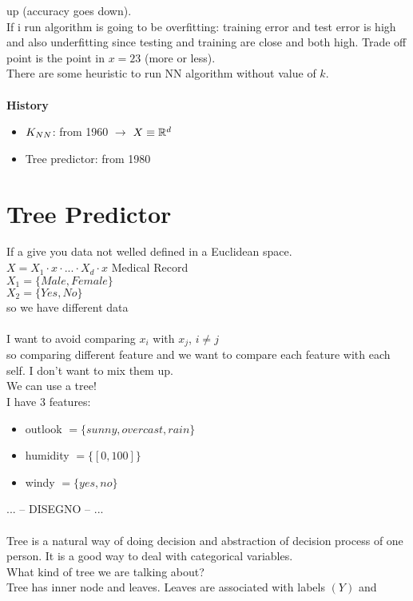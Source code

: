 \documentclass[../main.tex]{subfiles}
\begin{document}
up (accuracy goes down).\\
If i run algorithm is going to be overfitting: training error and test error is high and also underfitting since testing and training are close and both high.
Trade off point is the point in $x = 23$ (more or less).\\
There are some heuristic to run NN algorithm without value of $k$.
\\\\
\textbf{History}
\begin{itemize}
\item $K_{NN}$: from 1960 $\rightarrow$ $X \equiv \mathbb{R}^d$
\item Tree predictor: from 1980
\\
\end{itemize}

\section{Tree Predictor}
If a give you data not welled defined in a Euclidean space.
\\
$X = X_1 \cdot x \cdot ... \cdot X_d \cdot x$ \qquad Medical Record
\\
$X_1 = \{Male, Female\}$\\
$X_2 = \{Yes, No\}$
\\
so we have different data
\\\\
I want to avoid comparing $x_i$ with $x_j$,  $i\neq j $\\
so comparing different feature and we want to compare each feature with
each self. I don’t want to mix them up.\\
We can use a tree!
\\
I have 3 features:
\begin{itemize}
\item outlook  $= \{sunny, overcast, rain\}$
\item humidity $= \{[0,100]\}$
\item windy $ = \{yes,no\}$
\end{itemize}
... -- DISEGNO -- ...\\\\
Tree is a natural way of doing decision and abstraction of decision process of
one person. It is a good way to deal with categorical variables.\\
What kind of tree we are talking about?\\
Tree has inner node and leaves. Leaves are associated with labels $(Y)$ and
\end{document}

